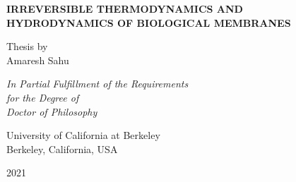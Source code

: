 


\vspace*{1.2cm}
\begin{center}
	\large

	{\bfseries \large IRREVERSIBLE THERMODYNAMICS AND\\[7pt] HYDRODYNAMICS OF BIOLOGICAL MEMBRANES}

	\vspace{2.0cm}
	{
		Thesis by\\[5pt]
		Amaresh Sahu
	}

	\vspace{2.2cm}
	{\textit{
		In Partial Fulfillment of the Requirements\\[4pt]
		for the Degree of\\[7pt]
		Doctor of Philosophy
	}}

	\vspace{5.5cm}
	{
		University of California at Berkeley\\[4pt]
		Berkeley, California, USA\\[4pt]
	}

	\vspace{0.7cm}
	{
		2021
	}

\end{center}




